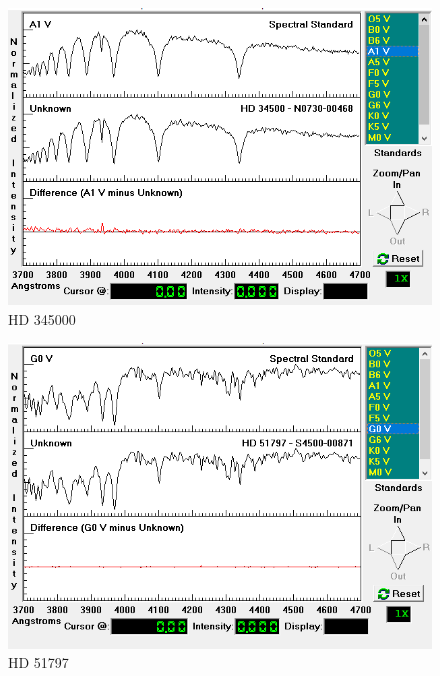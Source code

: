 \documentclass[letterpaper,11pt]{report}
\begin{document}
    \begin{figure}[H]
        \centering
        \includegraphics[scale=0.4]{HD 34500.png}
        \caption{HD 345000}
        \label{fig:my_label}
    \end{figure}
    
    \begin{figure}[H]
        \centering
        \includegraphics[scale=0.4]{HD 51797.png}
        \caption{HD 51797}
        \label{fig:my_label}
    \end{figure}
    
\end{document}
